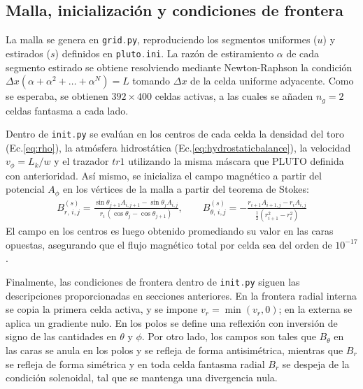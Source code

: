 \documentclass[11pt, letterpaper]{article}
\begin{document}
\subsection{Malla, inicialización y condiciones de frontera}

La malla se genera en \lstinline[language=C]|grid.py|, reproduciendo los segmentos uniformes ($u$) y estirados ($s$) definidos en \lstinline[language=C]|pluto.ini|. La razón de estiramiento $\alpha$ de cada segmento estirado se obtiene resolviendo mediante Newton-Raphson la condición $\Delta x (\alpha + \alpha^2 + \dots + \alpha^N) = L$ tomando $\Delta x$ de la celda uniforme adyacente. Como se esperaba, se obtienen $392\times400$ celdas activas, a las cuales se añaden $n_g = 2$ celdas fantasma a cada lado.

\medskip

Dentro de \lstinline[language=C]|init.py| se evalúan en los centros de cada celda la densidad del toro (Ec.\ref{eq:rho}), la atmósfera hidrostática (Ec.\ref{eq:hydrostaticbalance}), la velocidad $v_{\phi} = L_k / w$ y el trazador $tr1$ utilizando la misma máscara que PLUTO definida con anterioridad. Así mismo, se inicializa el campo magnético a partir del potencial $A_{\phi}$ en los vértices de la malla a partir del teorema de Stokes:
\begin{align}\label{eq:B_stokes}
    B^{(s)}_{r,\,i,j} = \frac{\sin\theta_{j+1}A_{i,j+1} - \sin\theta_{j}A_{i,j}}{r_i\,(\cos\theta_j - \cos\theta_{j+1})}, \qquad
    B^{(s)}_{\theta,\,i,j} = -\frac{r_{i+1}A_{i+1,j} - r_{i}A_{i,j}}{\tfrac{1}{2}\left(r_{i+1}^2 - r_i^2\right)}
\end{align}
El campo en los centros es luego obtenido promediando su valor en las caras opuestas, asegurando que el flujo magnético total por celda sea del orden de $10^{-17}$.  

\medskip

Finalmente, las condiciones de frontera dentro de \lstinline[language=C]|init.py| siguen las descripciones proporcionadas en secciones anteriores. En la frontera radial interna se copia la primera celda activa, y se impone $v_r = \min(v_r, 0)$; en la externa se aplica un gradiente nulo. En los polos se define una reflexión con inversión de signo de las cantidades en $\theta$ y $\phi$. Por otro lado, los campos son tales que $B_{\theta}$ en las caras se anula en los polos y se refleja de forma antisimétrica, mientras que $B_r$ se refleja de forma simétrica y en toda celda fantasma radial $B_r$ se despeja de la condición solenoidal, tal que se mantenga una divergencia nula.
\end{document}

